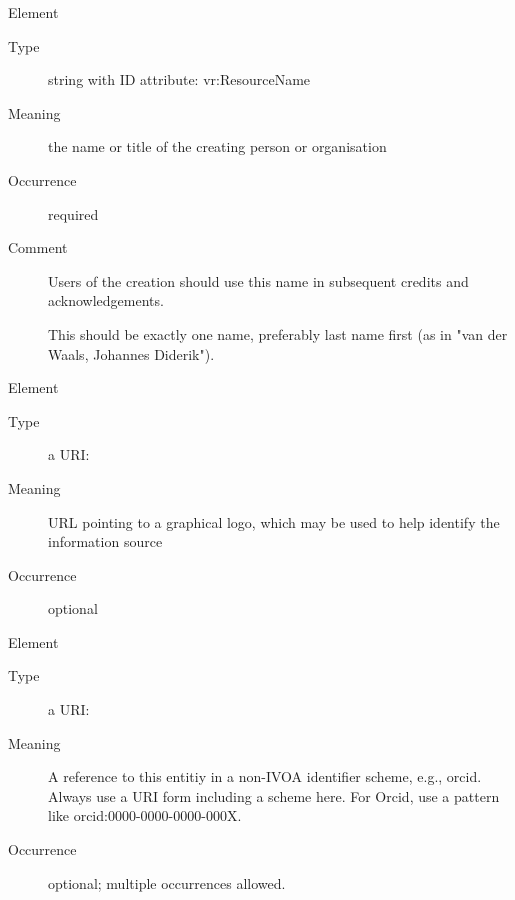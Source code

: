 \documentclass[11pt,a4paper]{ivoa}
\begin{document}
\begin{generated}
\begingroup\small\begin{bigdescription}\item[Element \xmlel{name}]
\begin{description}
\item[Type] string with ID attribute: vr:ResourceName
\item[Meaning] 
                  the name or title of the creating person or organisation
              
\item[Occurrence] required
\item[Comment] 
                  Users of the creation should use this name in
                  subsequent credits and acknowledgements.

                  This should be exactly one name, preferably last name
                  first (as in {"}van der Waals, Johannes Diderik{"}).
              

\end{description}
\item[Element \xmlel{logo}]
\begin{description}
\item[Type] a URI: 
\item[Meaning] 
                URL pointing to a graphical logo, which may be used to help 
                identify the information source
              
\item[Occurrence] optional

\end{description}
\item[Element \xmlel{altIdentifier}]
\begin{description}
\item[Type] a URI: 
\item[Meaning] 
                 A reference to this entitiy in a non-IVOA identifier
                 scheme, e.g., orcid.  Always use a URI form including
                 a scheme here.  For Orcid, use a pattern like
                 orcid:0000-0000-0000-000X.
              
\item[Occurrence] optional; multiple occurrences allowed.

\end{description}


\end{bigdescription}\endgroup

\endgroup
\end{generated}
\end{document}
